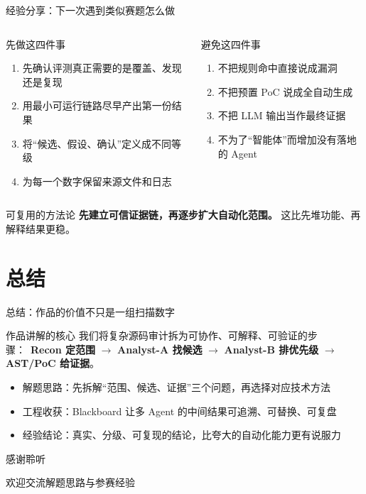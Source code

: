 \documentclass[10pt,aspectratio=169]{beamer}
\newcommand{\key}[1]{\textcolor{accentblue}{\textbf{#1}}}
\begin{document}
\begin{frame}{经验分享：下一次遇到类似赛题怎么做}
  \begin{columns}[T,onlytextwidth]
    \begin{block}{先做这四件事}
      \begin{enumerate}\small
        \item 先确认评测真正需要的是覆盖、发现还是复现
        \item 用最小可运行链路尽早产出第一份结果
        \item 将“候选、假设、确认”定义成不同等级
        \item 为每一个数字保留来源文件和日志
      \end{enumerate}
    \end{block}
    \begin{block}{避免这四件事}
      \begin{enumerate}\small
        \item 不把规则命中直接说成漏洞
        \item 不把预置 PoC 说成全自动生成
        \item 不把 LLM 输出当作最终证据
        \item 不为了“智能体”而增加没有落地的 Agent
      \end{enumerate}
    \end{block}
  \end{columns}

  \vspace{0.8em}
  \begin{alertblock}{可复用的方法论}
    \textbf{先建立可信证据链，再逐步扩大自动化范围。} 这比先堆功能、再解释结果更稳。
  \end{alertblock}
\end{frame}

\section{总结}

\begin{frame}{总结：作品的价值不只是一组扫描数字}
  \begin{block}{作品讲解的核心}
    我们将复杂源码审计拆为可协作、可解释、可验证的步骤：\
    \key{Recon 定范围} $\rightarrow$ \key{Analyst-A 找候选} $\rightarrow$ \key{Analyst-B 排优先级} $\rightarrow$ \key{AST/PoC 给证据}。
  \end{block}

  \vspace{0.6em}
  \begin{itemize}
    \item 解题思路：先拆解“范围、候选、证据”三个问题，再选择对应技术方法
    \item 工程收获：Blackboard 让多 Agent 的中间结果可追溯、可替换、可复盘
    \item 经验结论：真实、分级、可复现的结论，比夸大的自动化能力更有说服力
  \end{itemize}
\end{frame}

\begin{frame}[standout]
  感谢聆听
  
  \vspace{0.5em}
  \normalsize 欢迎交流解题思路与参赛经验
\end{frame}
\end{document}
